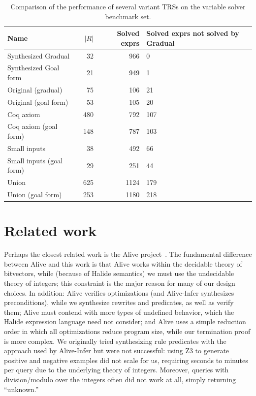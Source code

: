 \begin{table}
\centering
\caption{Comparison of the performance of several variant TRSs on the variable solver benchmark set.}
\begin{tabular}{l|r|r|p{5cm}}
Name & $|R|$ & Solved exprs & Solved exprs \newline not solved by Gradual \\
\hline
Synthesized Gradual & 32 & 966 & 0 \\
Synthesized Goal form & 21 & 949 & 1 \\
Original (gradual) & 75 & 106 & 21 \\
Original (goal form) & 53 & 105 & 20 \\ 
Coq axiom & 480 & 792 & 107 \\
Coq axiom (goal form) & 148 & 787 & 103 \\
Small inputs & 38 & 492 & 66 \\
Small inputs (goal form) & 29 & 251 & 44 \\
Union & ~625 & 1124 & 179 \\
Union (goal form) & ~253 & 1180 & 218
\end{tabular}
\label{tab:varsolverTRScomp}
\end{table}

\section{Related work}
\label{sec:related}

Perhaps the closest related work is the Alive project~\citep{lopes2015alive,menendez2017aliveinfer}.
The fundamental difference between Alive and this
work is that Alive works within the decidable theory of bitvectors, while
(because of Halide semantics) we must use the undecidable theory of integers;
this constraint is the major reason for many of our design choices. In addition:
Alive verifies optimizations (and Alive-Infer synthesizes preconditions), while
we synthesize rewrites and predicates, as well as verify them; Alive must contend
with more types of undefined behavior, which the Halide expression
language need not consider; and Alive uses a simple reduction order in
which all optimizations reduce program size, while our termination proof is more
complex. We originally tried synthesizing rule predicates with the approach used
by Alive-Infer but were not successful: using Z3 to generate positive and
negative examples did not scale for us, requiring seconds to minutes per query
due to the underlying theory of integers.  Moreover, queries with
division/modulo over the integers often did not work at all, simply returning
``unknown.''

